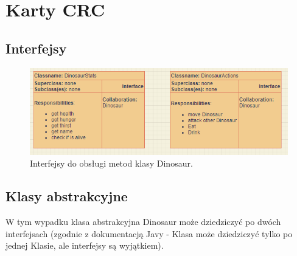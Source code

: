 \section{Karty CRC}
\subsection{Interfejsy}
\begin{figure}[h]
    \centering
    \includegraphics{images/crc/interfaces.png}
    \caption{Interfejsy do obsługi metod klasy Dinosaur.}
    \label{fig:interface}
\end{figure}

\subsection{Klasy abstrakcyjne}
W tym wypadku klasa abstrakcyjna Dinosaur może dziedziczyć po dwóch interfejsach (zgodnie z dokumentacją Javy - Klasa może dziedziczyć tylko po jednej Klasie, ale interfejsy są wyjątkiem).


